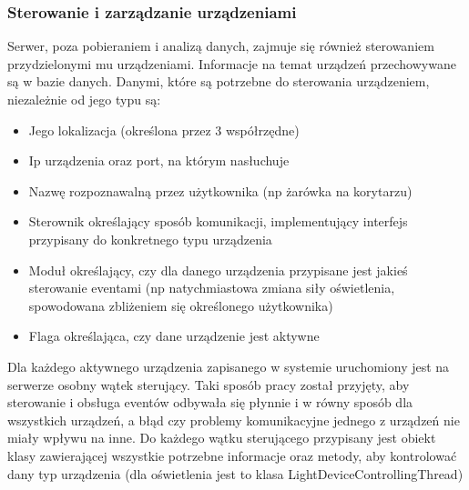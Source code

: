 \documentclass{article}
\begin{document}
		\subsubsection{Sterowanie i zarządzanie urządzeniami}
		Serwer, poza pobieraniem i analizą danych, zajmuje się również sterowaniem przydzielonymi mu urządzeniami. Informacje na temat urządzeń przechowywane są w bazie danych. Danymi, które są potrzebne do sterowania urządzeniem, niezależnie od jego typu są:
		\begin{itemize}
			\item Jego lokalizacja (określona przez 3 współrzędne)
			\item Ip urządzenia oraz port, na którym nasłuchuje
			\item Nazwę rozpoznawalną przez użytkownika (np żarówka na korytarzu)
			\item Sterownik określający sposób komunikacji, implementujący interfejs przypisany do konkretnego typu urządzenia
			\item Moduł określający, czy dla danego urządzenia przypisane jest jakieś sterowanie eventami (np natychmiastowa zmiana siły oświetlenia, spowodowana zbliżeniem się określonego użytkownika)
			\item Flaga określająca, czy dane urządzenie jest aktywne
		\end{itemize}
		Dla każdego aktywnego urządzenia zapisanego w systemie uruchomiony jest na serwerze osobny wątek sterujący. Taki sposób pracy został przyjęty, aby sterowanie i obsługa eventów odbywała się płynnie i w równy sposób dla wszystkich urządzeń, a błąd czy problemy komunikacyjne jednego z urządzeń nie miały wpływu na inne. Do każdego wątku sterującego przypisany jest obiekt klasy zawierającej wszystkie potrzebne informacje oraz metody, aby kontrolować dany typ urządzenia (dla oświetlenia jest to klasa LightDeviceControllingThread)
\end{document}
